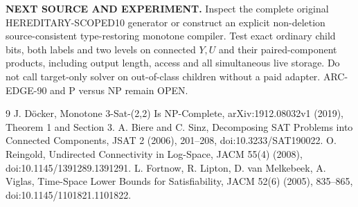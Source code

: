 \documentclass[11pt]{article}
\begin{document}
\noindent\textbf{NEXT SOURCE AND EXPERIMENT.} Inspect the complete original HEREDITARY-SCOPED10 generator or construct an explicit non-deletion source-consistent type-restoring monotone compiler. Test exact ordinary child bits, both labels and two levels on connected $Y,U$ and their paired-component products, including output length, access and all simultaneous live storage. Do not call target-only solver on out-of-class children without a paid adapter. ARC-EDGE-90 and P versus NP remain OPEN.

\begin{thebibliography}{9}
 J. D\"ocker, Monotone 3-Sat-(2,2) Is NP-Complete, arXiv:1912.08032v1 (2019), Theorem 1 and Section 3.
 A. Biere and C. Sinz, Decomposing SAT Problems into Connected Components, JSAT 2 (2006), 201--208, doi:10.3233/SAT190022.
 O. Reingold, Undirected Connectivity in Log-Space, JACM 55(4) (2008), doi:10.1145/1391289.1391291.
 L. Fortnow, R. Lipton, D. van Melkebeek, A. Viglas, Time-Space Lower Bounds for Satisfiability, JACM 52(6) (2005), 835--865, doi:10.1145/1101821.1101822.
\end{thebibliography}
\end{document}
